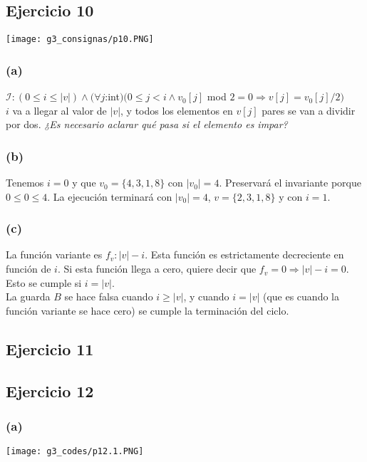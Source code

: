 \documentclass[12 pt]{article}
\begin{document}
\subsection*{Ejercicio 10}
    \begin{center}
        \texttt{[image: g3\_consignas/p10.PNG]}
    \end{center}
    \subsubsection*{(a)}
        $\mathcal{I}: (0 \leq i \leq |v|) \wedge (\forall j$:int$)(0 \leq j < i \wedge v_{0}[j]$ mod $2 = 0 \Rightarrow v[j] = v_{0}[j]/2)$
        \\
        $i$ va a llegar al valor de $|v|$, y todos los elementos en $v[j]$ pares se van a dividir por dos.\textit{ ¿Es necesario aclarar qué pasa si el elemento es impar?}
    \subsubsection*{(b)}
        Tenemos $i = 0$ y que $v_{0} = \{4, 3, 1, 8\}$ con $|v_{0}| = 4$. Preservará el invariante porque $0 \leq 0 \leq 4$. La ejecución terminará con $|v_{0}| = 4$, $v = \{2, 3, 1, 8\}$ y con $i = 1$.
    \subsubsection*{(c)}
        La función variante es $f_{v}: |v| - i$. Esta función es estrictamente decreciente en función de $i$. Si esta función llega a cero, quiere decir que $f_{v} = 0 \Rightarrow |v|-i = 0$. Esto se cumple si $i = |v|$.
        \\
        La guarda $B$ se hace falsa cuando $i \geq |v|$, y cuando $i = |v|$ (que es cuando la función variante se hace cero) se cumple la terminación del ciclo.

\subsection*{Ejercicio 11}

\subsection*{Ejercicio 12}
    \subsubsection*{(a)}
        \begin{center}
            \texttt{[image: g3\_codes/p12.1.PNG]}
        \end{center}
\end{document}
